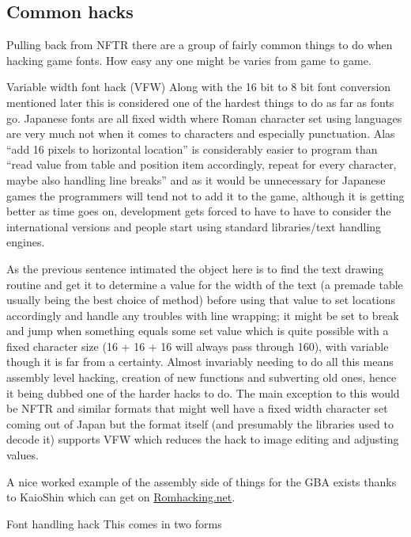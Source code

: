 \documentclass[
]{book}
\begin{document}
\hypertarget{common-hacks}{%
\subsection{Common hacks}\label{common-hacks}}

Pulling back from NFTR there are a group of fairly common things to do when hacking game fonts. How easy any one might be varies from game to game.

Variable width font hack (VFW) Along with the 16 bit to 8 bit font conversion mentioned later this is considered one of the hardest things to do as far as fonts go. Japanese fonts are all fixed width where Roman character set using languages are very much not when it comes to characters and especially punctuation. Alas ``add 16 pixels to horizontal location'' is considerably easier to program than ``read value from table and position item accordingly, repeat for every character, maybe also handling line breaks'' and as it would be unnecessary for Japanese games the programmers will tend not to add it to the game, although it is getting better as time goes on, development gets forced to have to have to consider the international versions and people start using standard libraries/text handling engines.

As the previous sentence intimated the object here is to find the text drawing routine and get it to determine a value for the width of the text (a premade table usually being the best choice of method) before using that value to set locations accordingly and handle any troubles with line wrapping; it might be set to break and jump when something equals some set value which is quite possible with a fixed character size (16 + 16 + 16 will always pass through 160), with variable though it is far from a certainty. Almost invariably needing to do all this means assembly level hacking, creation of new functions and subverting old ones, hence it being dubbed one of the harder hacks to do. The main exception to this would be NFTR and similar formats that might well have a fixed width character set coming out of Japan but the format itself (and presumably the libraries used to decode it) supports VFW which reduces the hack to image editing and adjusting values.

A nice worked example of the assembly side of things for the GBA exists thanks to KaioShin which can get on \href{http://www.romhacking.net/documents/337/}{Romhacking.net}.

Font handling hack This comes in two forms
\end{document}
